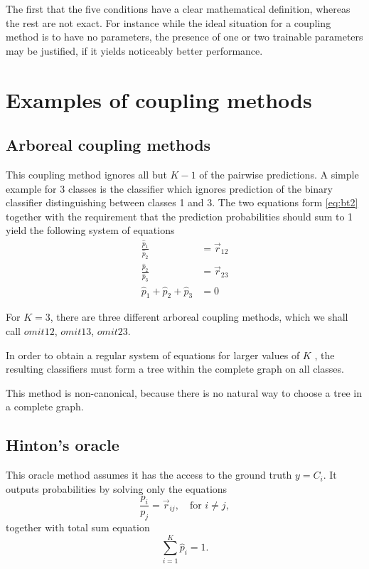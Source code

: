 \documentclass[twoside,11pt]{article}
\begin{document}
The first that the five conditions have a clear mathematical definition, whereas the rest are not exact. For instance while the ideal situation for a coupling method is to have no parameters, the presence of one or two trainable parameters may be justified, if it yields noticeably better performance.


\section{Examples of coupling methods}


\subsection{Arboreal coupling methods}

This coupling method ignores all but $K-1$ of the pairwise predictions. A simple example for 3 classes is the classifier which ignores prediction of the binary classifier distinguishing between classes 1 and 3. The two equations form \eqref{eq:bt2} together with the requirement that the prediction probabilities should sum to 1 yield the following system of equations
\begin{equation}
\begin{split}
\frac{\hat p_1}{\hat p_2} &= \vec{r}_{12}\\
\frac{\hat p_2}{\hat p_3} &= \vec{r}_{23}\\
\hat p_1 + \hat p_2 + \hat p_3 &= 0
\end{split}
\end{equation}

For $K=3$, there are three different arboreal coupling methods, which we shall call $omit12$, $omit13$, $omit23$. 

In order to obtain a regular system of equations for  larger values of $K$ , the resulting classifiers must form a tree within the complete graph on all classes. 

This method is non-canonical, because there is no natural way to choose a tree in a complete graph.

\subsection{Hinton's oracle}

This oracle method assumes it has the access to the ground truth $y = C_i$. It outputs probabilities by solving only the equations
$$
\frac{p_i}{p_j} = \vec{r}_{ij},\quad \textrm{for }i\not = j,
$$
together  with total sum equation
$$
\sum_{i=1}^K  \hat p_i = 1.
$$
\end{document}
